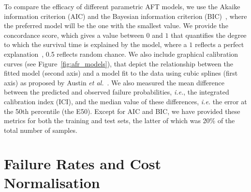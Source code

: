 To compare the efficacy of different parametric AFT models, we use the Akaike information criterion (AIC) and the Bayesian information criterion (BIC)~\cite{stoica2004model,taddy2019business}, where the preferred model will be the one with the smallest value. We provide the
concordance score, which gives a value between $0$ and $1$ that quantifies the degree to which the survival time is explained by the model, where a $1$ reflects a perfect explanation~\cite{kleinbaum1996survival}, 0.5 reflects random chance. We also include graphical calibration curves (see Figure~\ref{fig:afr_models}), that depict the relationship between the fitted model (second axis) and a model fit to the data using cubic splines (first axis) as proposed by Austin \textit{et al.}~\cite{ici}. We also measured the mean difference between the predicted and observed failure probabilities, \textit{i.e.}, the integrated calibration index (ICI), and the median value of these differences, \textit{i.e.} the error at the 50th percentile (the E50). Except for AIC and BIC, we have provided these metrics for both the training and test sets, the latter of which was 20\% of the total number of samples.






\section{Failure Rates and Cost Normalisation}
\label{cost_normalization}

